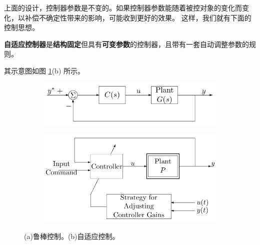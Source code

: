 上面的设计，控制器参数是不变的。如果控制器参数能随着被控对象的变化而变化，以补偿不确定性带来的影响，可能收到更好的效果。
这样，我们就有下面的控制思想。
\begin{definition}
    \textbf{自适应控制器}是\textbf{结构固定}但具有\textbf{可变参数}的控制器，且带有一套自动调整参数的规则。
  \end{definition}
  其示意图如图 \ref{adaptive_robust}(b) 所示。
\begin{figure}[htbp]
  \centering
  \begin{subfigure}{0.4\textwidth}
    \includegraphics[width=1\linewidth]{figure/adaptive/robust.png} %
    \caption{}
\end{subfigure}
  \begin{subfigure}{0.4\textwidth}
    \includegraphics[width=1\linewidth]{figure/adaptive/adaptive_controller.png} %
    \caption{}
\end{subfigure}
\caption{(a)鲁棒控制。(b)自适应控制。}
\label{adaptive_robust}
\end{figure}
    
